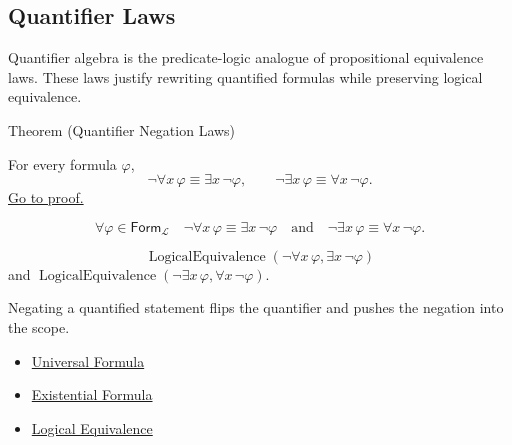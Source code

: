 
\subsection*{Quantifier Laws}

\begin{remark*}
Quantifier algebra is the predicate-logic analogue of propositional
equivalence laws. These laws justify rewriting quantified formulas while
preserving logical equivalence.
\end{remark*}

\begin{theorembox}{Theorem (Quantifier Negation Laws)}
\begin{theorem}
\label{thm:qneg}
For every formula \(\varphi\),
\[
\neg\forall x\,\varphi \equiv \exists x\,\neg\varphi,
\qquad
\neg\exists x\,\varphi \equiv \forall x\,\neg\varphi.
\]
\hyperref[prf:qneg]{Go to proof.}
\end{theorem}
\end{theorembox}

\begin{remark*}
\[
\forall \varphi\in\mathsf{Form}_{\mathcal L}\quad
\neg\forall x\,\varphi \equiv \exists x\,\neg\varphi
\quad\text{and}\quad
\neg\exists x\,\varphi \equiv \forall x\,\neg\varphi.
\]
\end{remark*}

\begin{remark*}
\[
  \operatorname{LogicalEquivalence}(\neg\forall x\,\varphi,\exists x\,\neg\varphi)
\]
and
\(\operatorname{LogicalEquivalence}(\neg\exists x\,\varphi,\forall x\,\neg\varphi)\).
\end{remark*}

\begin{remark*}[Interpretation]
Negating a quantified statement flips the quantifier and pushes the negation
into the scope.
\end{remark*}

\begin{dependencies}
\begin{itemize}
  \item \hyperref[def:universal-q]{Universal Formula}
  \item \hyperref[def:existential-q]{Existential Formula}
  \item \hyperref[def:log-equiv]{Logical Equivalence}
\end{itemize}
\end{dependencies}

